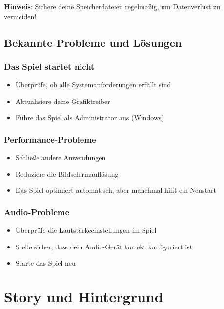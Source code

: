\documentclass[
  a4paper,
  11pt,
  ngerman,
  parskip=half,
  bibliography=totoc,
  listof=totoc
]{scrreprt}
\begin{document}
\textbf{Hinweis}: Sichere deine Speicherdateien regelmäßig, um Datenverlust zu vermeiden!

\section{Bekannte Probleme und Lösungen}

\subsection{Das Spiel startet nicht}

\begin{itemize}
    \item Überprüfe, ob alle Systemanforderungen erfüllt sind
    \item Aktualisiere deine Grafiktreiber
    \item Führe das Spiel als Administrator aus (Windows)
\end{itemize}

\subsection{Performance-Probleme}

\begin{itemize}
    \item Schließe andere Anwendungen
    \item Reduziere die Bildschirmauflösung
    \item Das Spiel optimiert automatisch, aber manchmal hilft ein Neustart
\end{itemize}

\subsection{Audio-Probleme}

\begin{itemize}
    \item Überprüfe die Lautstärkeeinstellungen im Spiel
    \item Stelle sicher, dass dein Audio-Gerät korrekt konfiguriert ist
    \item Starte das Spiel neu
\end{itemize}


\chapter{Story und Hintergrund}
\end{document}
